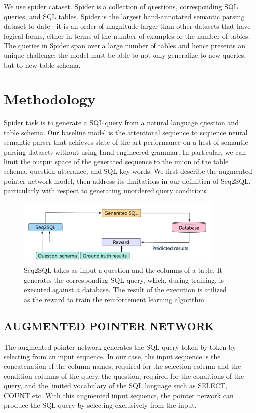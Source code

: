 \documentclass{article}
\begin{document}
We use spider dataset. Spider is a collection of questions, corresponding SQL queries, and SQL tables. Spider is the largest hand-annotated semantic parsing dataset to date - it is an order of magnitude larger than other datasets that have logical forms, either in terms of the number of examples or the number of tables. The queries in Spider span over a large number of tables and hence presents an unique challenge: the model must be able to not only generalize to new queries, but to new table schema.

\section{Methodology}

Spider task is to generate a SQL query from a natural language question and table schema.
Our baseline model is the attentional sequence to sequence neural semantic parser that achieves state-of-the-art performance on a host of semantic parsing datasets
without using hand-engineered grammar. In particular, we can limit the output space of the generated
sequence to the union of the table schema, question utterance, and SQL key words. We first describe
the augmented pointer network model, then address its limitations in our definition of Seq2SQL,
particularly with respect to generating unordered query conditions.
\clearpage

\begin{figure}[htp]
    \centering
    \includegraphics[width=10cm]{Seq2SQL Fig 1}
    \caption{ Seq2SQL takes as input a question and the columns of a table. It generates the corresponding SQL query, which, during training, is executed against a database. The result of the
execution is utilized as the reward to train the reinforcement learning algorithm.}
    \label{fig:galaxy}
\end{figure}

\subsection{AUGMENTED POINTER NETWORK}
The augmented pointer network generates the SQL query token-by-token by selecting from an input
sequence. In our case, the input sequence is the concatenation of the column names, required for the
selection column and the condition columns of the query, the question, required for the conditions
of the query, and the limited vocabulary of the SQL language such as SELECT, COUNT etc. With this augmented input sequence, the pointer network
can produce the SQL query by selecting exclusively from the input.
\end{document}

